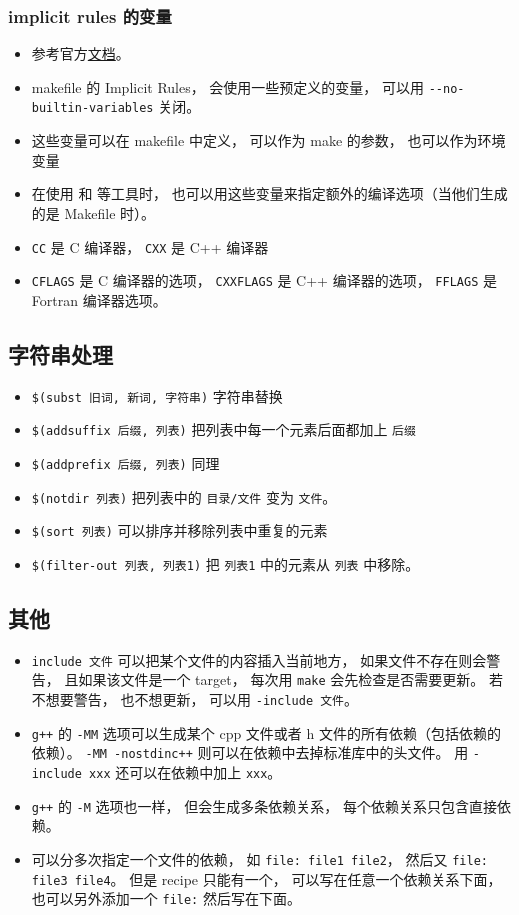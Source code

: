\subsubsection{implicit rules 的变量}
\begin{itemize}
\item 参考官方\href{https://www.gnu.org/software/make/manual/html_node/Implicit-Variables.html}{文档}。
\item makefile 的 Implicit Rules， 会使用一些预定义的变量， 可以用 \verb|--no-builtin-variables| 关闭。
\item 这些变量可以在 makefile 中定义， 可以作为 make 的参数， 也可以作为环境变量
\item 在使用  和  等工具时， 也可以用这些变量来指定额外的编译选项（当他们生成的是 Makefile 时）。
\item \verb|CC| 是 C 编译器， \verb|CXX| 是 C++ 编译器
\item \verb|CFLAGS| 是 C 编译器的选项， \verb|CXXFLAGS| 是 C++ 编译器的选项， \verb|FFLAGS| 是 Fortran 编译器选项。
\end{itemize}

\subsection{字符串处理}
\begin{itemize}
\item \verb|$(subst 旧词, 新词, 字符串)| 字符串替换
\item \verb|$(addsuffix 后缀, 列表)| 把列表中每一个元素后面都加上 \verb|后缀|
\item \verb|$(addprefix 后缀, 列表)| 同理
\item \verb|$(notdir 列表)| 把列表中的 \verb|目录/文件| 变为 \verb|文件|。
\item \verb|$(sort 列表)| 可以排序并移除列表中重复的元素
\item \verb|$(filter-out 列表, 列表1)| 把 \verb|列表1| 中的元素从 \verb|列表| 中移除。
\end{itemize}


\subsection{其他}
\begin{itemize}
\item \verb|include 文件| 可以把某个文件的内容插入当前地方， 如果文件不存在则会警告， 且如果该文件是一个 target， 每次用 \verb|make| 会先检查是否需要更新。 若不想要警告， 也不想更新， 可以用 \verb|-include 文件|。
\item \verb|g++| 的 \verb|-MM| 选项可以生成某个 cpp 文件或者 h 文件的所有依赖（包括依赖的依赖）。 \verb|-MM -nostdinc++| 则可以在依赖中去掉标准库中的头文件。 用 \verb|-include xxx| 还可以在依赖中加上 \verb|xxx|。
\item \verb|g++| 的 \verb|-M| 选项也一样， 但会生成多条依赖关系， 每个依赖关系只包含直接依赖。
\item 可以分多次指定一个文件的依赖， 如 \verb|file: file1 file2|， 然后又 \verb|file: file3 file4|。 但是 recipe 只能有一个， 可以写在任意一个依赖关系下面， 也可以另外添加一个 \verb|file:| 然后写在下面。
\end{itemize}
